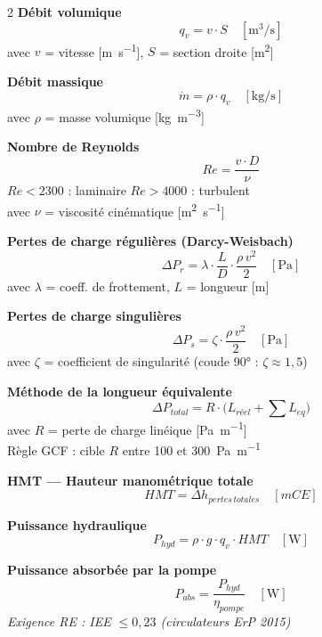 \begin{tcolorbox}[
  enhanced, colback=FedBlue!3, colframe=FedBlue!50,
  fonttitle=\bfseries\sffamily, coltitle=FedBlue,
  title={FICHE MÉMO — Hydraulique des circuits}, boxrule=0.8pt, arc=2pt,
  width=\textwidth
]
\begin{multicols}{2}
\textbf{Débit volumique}
\[ q_v = v \cdot S \quad \left[\si{\cubic\metre\per\second}\right] \]
avec $v$ = vitesse [\si{\metre\per\second}], $S$ = section droite [\si{\metre\squared}]

\medskip
\textbf{Débit massique}
\[ \dot{m} = \rho \cdot q_v \quad \left[\si{\kilogram\per\second}\right] \]
avec $\rho$ = masse volumique [\si{\kilogram\per\cubic\metre}]

\medskip
\textbf{Nombre de Reynolds}
\[ Re = \frac{v \cdot D}{\nu} \]
$Re < 2300$ : laminaire \quad $Re > 4000$ : turbulent \\
avec $\nu$ = viscosité cinématique [\si{\metre\squared\per\second}]

\medskip
\textbf{Pertes de charge régulières (Darcy-Weisbach)}
\[ \Delta P_r = \lambda \cdot \frac{L}{D} \cdot \frac{\rho\, v^2}{2} \quad \left[\si{\pascal}\right] \]
avec $\lambda$ = coeff. de frottement, $L$ = longueur [\si{\metre}]

\columnbreak

\textbf{Pertes de charge singulières}
\[ \Delta P_s = \zeta \cdot \frac{\rho\, v^2}{2} \quad \left[\si{\pascal}\right] \]
avec $\zeta$ = coefficient de singularité (coude 90° : $\zeta \approx 1{,}5$)

\medskip
\textbf{Méthode de la longueur équivalente}
\[ \Delta P_{total} = R \cdot \bigl(L_{réel} + \textstyle\sum L_{eq}\bigr) \]
avec $R$ = perte de charge linéique [\si{\pascal\per\metre}] \\
Règle GCF : cible $R$ entre \SI{100}{} et \SI{300}{\pascal\per\metre}

\medskip
\textbf{HMT — Hauteur manométrique totale}
\[ HMT = \Delta h_{pertes\,totales} \quad \left[\si{mCE}\right] \]

\medskip
\textbf{Puissance hydraulique}
\[ P_{hyd} = \rho \cdot g \cdot q_v \cdot HMT \quad \left[\si{\watt}\right] \]

\medskip
\textbf{Puissance absorbée par la pompe}
\[ P_{abs} = \frac{P_{hyd}}{\eta_{pompe}} \quad \left[\si{\watt}\right] \]
\textit{Exigence RE : IEE $\leq 0{,}23$ (circulateurs ErP 2015)}
\end{multicols}
\end{tcolorbox}

\finchapitre
